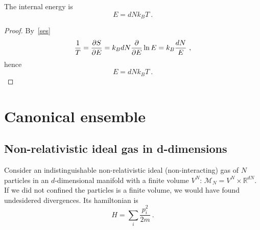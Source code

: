     The internal energy is 
    \begin{equation*}
        E = d N k_B T ~.
    \end{equation*}
    \begin{proof}
        By~\eqref{ses}
        \begin{equation*}
            \frac{1}{T} = \frac{\partial S}{\partial E} = k_B dN \frac{\partial}{\partial E} \ln E = k_B \frac{dN}{E} ~,
        \end{equation*}
        hence 
        \begin{equation*}
            E = d N k_B T ~.
        \end{equation*}
    \end{proof}

\chapter{Canonical ensemble}

\section{Non-relativistic ideal gas in d-dimensions}

    Consider an indistinguishable non-relativistic ideal (non-interacting) gas of $N$ particles in an $d$-dimensional manifold with a finite volume $V^N$: $\mathcal M_N = V^N \times \mathbb R^{dN}$. If we did not confined the particles is a finite volume, we would have found undesidered divergences. Its hamiltonian is 
    \begin{equation*}
        H = \sum_i \frac{p^2_i}{2m} ~.
    \end{equation*}

